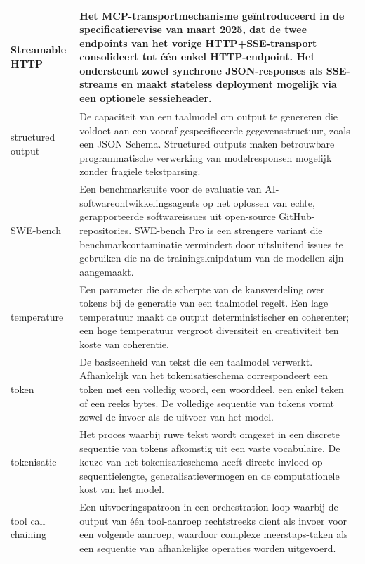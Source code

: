\begin{longtable}{p{} p{}}
Streamable HTTP &
    Het MCP-transportmechanisme geïntroduceerd in de specificatierevise van maart 2025, dat de twee endpoints van het vorige HTTP+SSE-transport consolideert tot één enkel HTTP-endpoint. Het ondersteunt zowel synchrone JSON-responses als SSE-streams en maakt stateless deployment mogelijk via een optionele sessieheader. \\
\midrule

structured output &
    De capaciteit van een taalmodel om output te genereren die voldoet aan een vooraf gespecificeerde gegevensstructuur, zoals een JSON Schema. Structured outputs maken betrouwbare programmatische verwerking van modelresponsen mogelijk zonder fragiele tekstparsing. \\
\midrule


SWE-bench &
    Een benchmarksuite voor de evaluatie van AI-softwareontwikkelingsagents op het oplossen van echte, gerapporteerde softwareissues uit open-source GitHub-repositories. SWE-bench Pro is een strengere variant die benchmarkcontaminatie vermindert door uitsluitend issues te gebruiken die na de trainingsknipdatum van de modellen zijn aangemaakt. \\
\midrule


temperature &
    Een parameter die de scherpte van de kansverdeling over tokens bij de generatie van een taalmodel regelt. Een lage temperatuur maakt de output deterministischer en coherenter; een hoge temperatuur vergroot diversiteit en creativiteit ten koste van coherentie. \\
\midrule

token &
    De basiseenheid van tekst die een taalmodel verwerkt. Afhankelijk van het tokenisatieschema correspondeert een token met een volledig woord, een woorddeel, een enkel teken of een reeks bytes. De volledige sequentie van tokens vormt zowel de invoer als de uitvoer van het model. \\
\midrule

tokenisatie &
    Het proces waarbij ruwe tekst wordt omgezet in een discrete sequentie van tokens afkomstig uit een vaste vocabulaire. De keuze van het tokenisatieschema heeft directe invloed op sequentielengte, generalisatievermogen en de computationele kost van het model. \\
\midrule

tool call chaining &
    Een uitvoeringspatroon in een orchestration loop waarbij de output van één tool-aanroep rechtstreeks dient als invoer voor een volgende aanroep, waardoor complexe meerstaps-taken als een sequentie van afhankelijke operaties worden uitgevoerd. \\
\midrule


\end{longtable}
